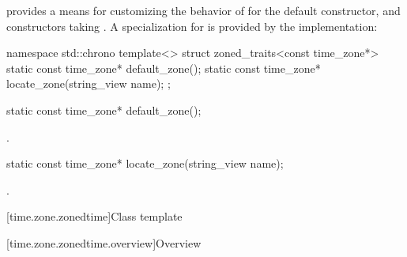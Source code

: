 \pnum
{} provides a means for customizing
the behavior of 
for the  default constructor,
and constructors taking .
A specialization for  is provided by the implementation:

\begin{codeblock}
namespace std::chrono {
  template<> struct zoned_traits<const time_zone*> {
    static const time_zone* default_zone();
    static const time_zone* locate_zone(string_view name);
  };
}
\end{codeblock}

%
\begin{itemdecl}
static const time_zone* default_zone();
\end{itemdecl}

\begin{itemdescr}
\pnum
\returns {}.
\end{itemdescr}

%
\begin{itemdecl}
static const time_zone* locate_zone(string_view name);
\end{itemdecl}

\begin{itemdescr}
\pnum
\returns {}.
\end{itemdescr}

[time.zone.zonedtime]{Class template }

[time.zone.zonedtime.overview]{Overview}


